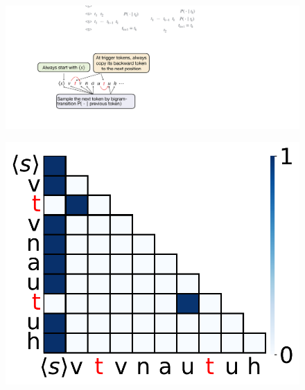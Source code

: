 \begin{figure}[t]
  \centering
  \begin{minipage}{0.38\textwidth}
      \centering
      \label{fig:bbm-dgp}
      \vspace{-.2em}
      \includegraphics[width=\linewidth]{Figures/BBM/BBM.pdf}
  \end{minipage}
  \begin{minipage}{0.26\textwidth}
      \centering
      \label{fig:bbm-attn}
      \vspace{-.2em}
      \includegraphics[width=\linewidth]{Figures/BBM/attn_fig1.pdf}
  \end{minipage}
  \begin{minipage}{0.27\textwidth}
      \centering
      \vspace{0pt}

\end{minipage}
\end{figure}
